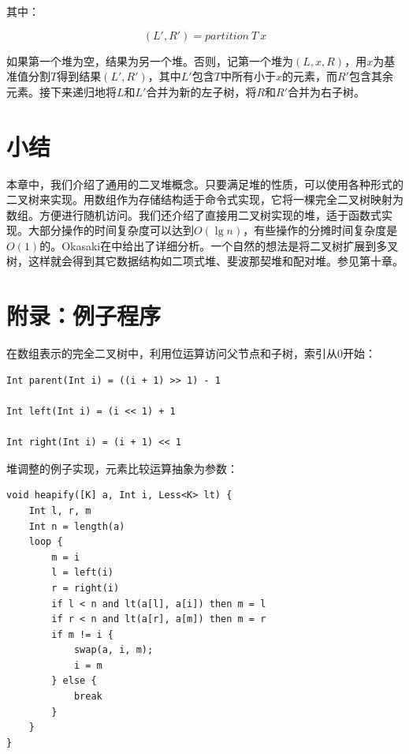 \documentclass[b5paper]{ctexart}
\begin{document}
其中：

\[
  (L', R') = partition\ T\ x
\]

如果第一个堆为空，结果为另一个堆。否则，记第一个堆为$(L, x, R)$，用$x$为基准值分割$T$得到结果$(L', R')$，其中$L'$包含$T$中所有小于$x$的元素，而$R'$包含其余元素。接下来递归地将$L$和$L'$合并为新的左子树，将$R$和$R'$合并为右子树。

\section{小结}

本章中，我们介绍了通用的二叉堆概念。只要满足堆的性质，可以使用各种形式的二叉树来实现。用数组作为存储结构适于命令式实现，它将一棵完全二叉树映射为数组。方便进行随机访问。我们还介绍了直接用二叉树实现的堆，适于函数式实现。大部分操作的时间复杂度可以达到$O(\lg n)$，有些操作的分摊时间复杂度是$O(1)$的。Okasaki在\cite{okasaki-book}中给出了详细分析。一个自然的想法是将二叉树扩展到多叉树，这样就会得到其它数据结构如二项式堆、斐波那契堆和配对堆。参见第十章。

\begin{Exercise}
\end{Exercise}

\section{附录：例子程序}

在数组表示的完全二叉树中，利用位运算访问父节点和子树，索引从0开始：

\begin{lstlisting}[language = Bourbaki]
Int parent(Int i) = ((i + 1) >> 1) - 1

Int left(Int i) = (i << 1) + 1

Int right(Int i) = (i + 1) << 1
\end{lstlisting}

堆调整的例子实现，元素比较运算抽象为参数：

\begin{lstlisting}[language = Bourbaki]
void heapify([K] a, Int i, Less<K> lt) {
    Int l, r, m
    Int n = length(a)
    loop {
        m = i
        l = left(i)
        r = right(i)
        if l < n and lt(a[l], a[i]) then m = l
        if r < n and lt(a[r], a[m]) then m = r
        if m != i {
            swap(a, i, m);
            i = m
        } else {
            break
        }
    }
}
\end{lstlisting}
\end{document}
